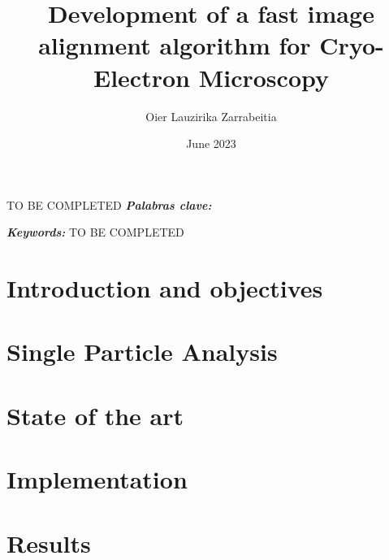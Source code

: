 \documentclass{etsit-report}
\title{Development of a fast image alignment algorithm for Cryo-Electron Microscopy}
\author{Oier Lauzirika Zarrabeitia}
\date{June 2023}
\begin{document}
\frontmatter

\cleardoublepage
\makefrontpage

\cleardoublepage
\makeinfopage

\cleardoublepage
\maketitle

\begin{otherlanguage}{spanish}
\begin{abstract}
    
\end{abstract}
TO BE COMPLETED
\textit{\textbf{Palabras clave:}}
\end{otherlanguage}

\begin{abstract}
    
\end{abstract}
\textit{\textbf{Keywords: }}
TO BE COMPLETED

\newpage
\tableofcontents
\listoffigures
\listoftables

\printglossary[type=\acronymtype]

\mainmatter

\chapter{Introduction and objectives}
\label{chap:introduction}


\chapter{Single Particle Analysis}
\label{chap:spa}


\chapter{State of the art}
\label{chap:state_of_the_art}


\chapter{Implementation}
\label{chap:implementation}


\chapter{Results}
\label{chap:results}

\end{document}
